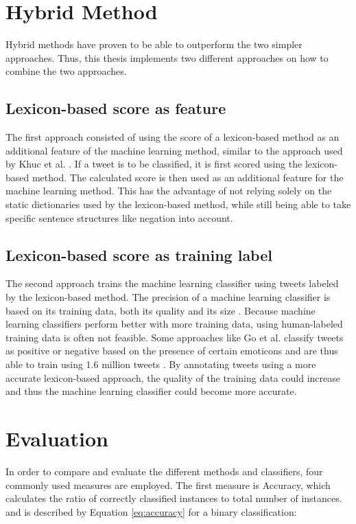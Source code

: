 \section{Hybrid Method}
Hybrid methods have proven to be able to outperform the two simpler approaches. Thus, this thesis implements two different approaches on how to combine the two approaches.

\subsection{Lexicon-based score as feature}
The first approach consisted of using the score of a lexicon-based method as an additional feature of the machine learning method, similar to the approach used by Khuc et al. \cite{khuc}. If a tweet is to be classified, it is first scored using the lexicon-based method. The calculated score is then used as an additional feature for the machine learning method. This has the advantage of not relying solely on the static dictionaries used by the lexicon-based method, while still being able to take specific sentence structures like negation into account.
\subsection{Lexicon-based score as training label}
The second approach trains the machine learning classifier using tweets labeled by the lexicon-based method. The precision of a machine learning classifier is based on its training data, both its quality and its size \cite{DBLP:journals/csur/GiachanouC16}. Because machine learning classifiers perform better with more training data, using human-labeled training data is often not feasible. Some approaches like Go et al. classify tweets as positive or negative based on the presence of certain emoticons and are thus able to train using 1.6 million tweets \cite{GoBHaHua2009}. By annotating tweets using a more accurate lexicon-based approach, the quality of the training data could increase and thus the machine learning classifier could become more accurate.

\section{Evaluation}
In order to compare and evaluate the different methods and classifiers, four commonly used measures are employed. The first measure is Accuracy, which calculates the ratio of correctly classified instances to total number of instances. and is described by Equation \eqref{eq:accuracy} for a binary classification:

